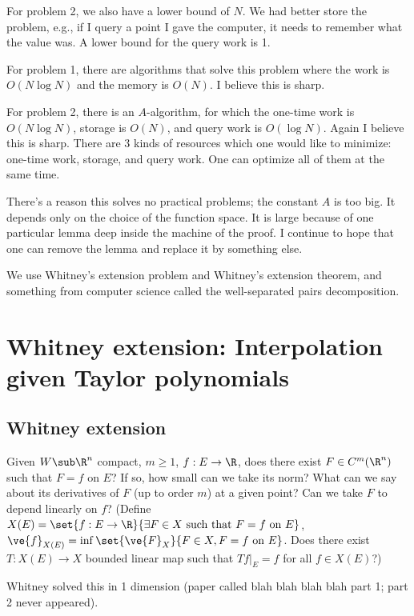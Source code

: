 For problem 2, we also have  a lower bound of $N$. We had better store the problem, e.g., if I query a point I gave the computer, it needs to remember what the value was. %
A lower bound for the query work is 1.

For problem 1, there are algorithms that solve this problem where the work is $O(N\log N)$ and the memory is $O(N)$. I believe this is sharp.

For problem 2, there is an $A$-algorithm, for which the one-time work is $O(N\log N)$, storage is $O(N)$, and query work is $O(\log N)$. Again I believe this is sharp. There are 3 kinds of resources which one would like to minimize: one-time work, storage, and query work. One can optimize all of them at the same time.

There's a reason this solves no practical problems; the constant $A$ is too big. It depends only on the choice of the function space. It is large because of one particular lemma deep inside the machine of the proof. I continue to hope that one can remove the lemma and replace it by something else.


We use
Whitney's extension problem and Whitney's extension theorem, and something from computer science called the well-separated pairs decomposition.

\section{Whitney extension: Interpolation given Taylor polynomials}

\subsection{Whitney extension}

\begin{prb}[Whitney, 1934]
Given $W\sub \R^n$ compact, $m\ge 1$, $f:E\to \R$, does there exist $F\in C^m(\R^n)$ such that $F=f$ on $E$?
If so, how small can we take its norm? 
What can we say about its derivatives of $F$ (up to order $m$) at a given point?
Can we take $F$ to depend linearly on $f$?
(Define $X(E)=\set{f:E\to \R}{\exists F\in X \text{ such that }F=f\text{ on }E}$, $\ve{f}_{X(E)}=\inf \set{\ve{F}_X}{F\in X,F=f\text{ on }E}$. Does there exist $T:X(E)\to X$ bounded linear map such that $Tf|_E=f$ for all $f\in X(E)$?)
\end{prb}
Whitney solved this in 1 dimension (paper called blah blah blah blah part 1; part 2 never appeared). 

